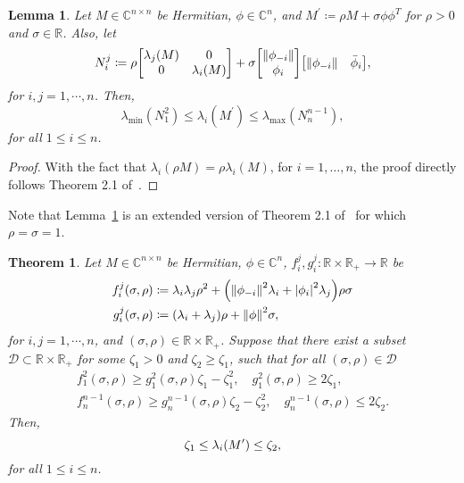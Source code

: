 \documentclass[]{IEEEtran}
\newtheorem{theorem}{Theorem}
\newtheorem{lemma}{Lemma}
\theoremstyle{definition}
\theoremstyle{remark}
\newcommand{\MB}[1]{\mathbb{#1}}
\newcommand{\MC}[1]{\mathcal{#1}}
\newcommand{\lmin}{\lambda_{\min}}
\newcommand{\lmax}{\lambda_{\max}}
\begin{document}
\begin{lemma}\label{lem:ipsen_eigenvalue_bounds}
	Let $M \in \MB{C}^{n \times n}$ be Hermitian, $\phi \in \MB{C}^n$, and $M^\prime
	\coloneqq \rho M + \sigma \phi \phi^T$ for $\rho > 0$ and $ \sigma \in
	\MB{R}$. Also, let
	\begin{equation*}
		N_i^j \coloneqq \rho \mqty[\lambda_j(M) & 0 \\ 0 & \lambda_i(M)] + \sigma
		\mqty[\norm{\phi_{-i}} \\ \phi_i] \mqty[\norm{\phi_{-i}} & \bar{\phi}_i],
	\end{equation*}
	for $i, j = 1, \cdots, n$. Then,
	\begin{equation}
		\lmin(N_1^2) \le \lambda_i(M^\prime) \le \lmax(N_n^{n-1}),
	\end{equation}
	for all $1 \le i \le n$.
\end{lemma}

\begin{proof}
	With the fact that $\lambda_i(\rho M) = \rho \lambda_i(M)$, for $i = 1,
	\dotsc, n$, the proof directly follows Theorem 2.1
	of~\cite{ipsen_refined_2009}.
\end{proof}

Note that Lemma~\ref{lem:ipsen_eigenvalue_bounds} is an extended version of
Theorem 2.1 of~\cite{ipsen_refined_2009} for which $\rho = \sigma = 1$.

\begin{theorem}
	Let $M \in \MB{C}^{n \times n}$ be Hermitian, $\phi \in \MB{C}^n$, $f_i^j,
	g_i^j : \MB{R} \times \MB{R}_{+} \to \MB{R}$ be
	\begin{align*}
		f_i^j(\sigma, \rho) &\coloneqq \lambda_i \lambda_j \rho^2 +
		\qty(\norm{\phi_{-i}}^2 \lambda_i + \abs{\phi_i}^2 \lambda_j) \rho \sigma
		\\
		g_i^j(\sigma, \rho) &\coloneqq \qty(\lambda_i + \lambda_j) \rho +
		\norm{\phi}^2 \sigma,
	\end{align*}
	for $i, j = 1, \cdots, n$, and $(\sigma, \rho) \in \MB{R} \times \MB{R}_{+}$.
	Suppose that there exist a subset $\MC{D} \subset \MB{R} \times \MB{R}_{+}$
	for some $\zeta_1 > 0$ and $\zeta_2 \ge \zeta_1$, such that for all $(\sigma,
	\rho) \in \MC{D}$
	\begin{gather}
		f_1^2(\sigma, \rho) \ge g_1^2(\sigma, \rho) \zeta_1 - \zeta_1^2,\quad
		g_1^2(\sigma, \rho) \ge 2 \zeta_1, \label{eq:theorem condition 1}\\
		f_n^{n-1}(\sigma, \rho) \ge g_n^{n-1}(\sigma, \rho) \zeta_2 -
		\zeta_2^2,\quad
		g_n^{n-1}(\sigma, \rho) \le 2 \zeta_2. \label{eq:theorem condition 2}
	\end{gather}
	Then,
	\begin{equation*}
		\zeta_1 \le \lambda_i \qty(M^\prime) \le \zeta_2,
	\end{equation*}
	for all $1 \le i \le n$.
\end{theorem}
\end{document}
